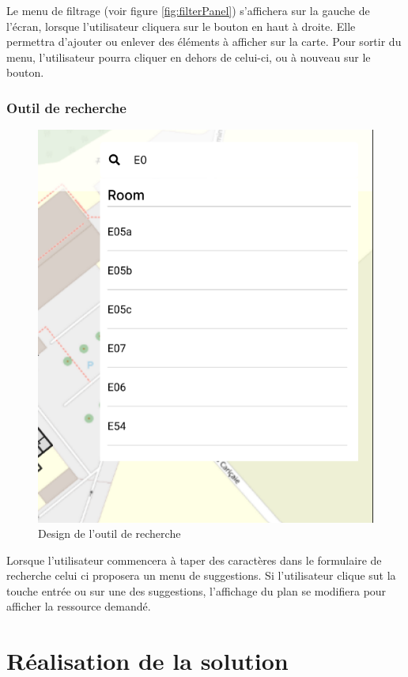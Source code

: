 \documentclass[
    iai, %
    il, %
]{heig-tb}
\begin{document}
Le menu de filtrage (voir figure \ref{fig:filterPanel}) s'affichera sur la gauche de l'écran, lorsque l'utilisateur cliquera sur le bouton en haut à droite.
Elle permettra d'ajouter ou enlever des éléments à afficher sur la carte.
Pour sortir du menu, l'utilisateur pourra cliquer en dehors de celui-ci, ou à nouveau sur le bouton.

\subsection{Outil de recherche}

\begin{figure}[h]
    \centering
    \includegraphics[scale=0.3]{designRecherche.png}
    \caption{Design de l'outil de recherche}
\end{figure}

Lorsque l'utilisateur commencera à taper des caractères dans le formulaire de recherche celui ci proposera un menu de suggestions.
Si l'utilisateur clique sut la touche entrée ou sur une des suggestions, l'affichage du plan se modifiera pour afficher la ressource demandé.


\chapter{Réalisation de la solution}
\end{document}
